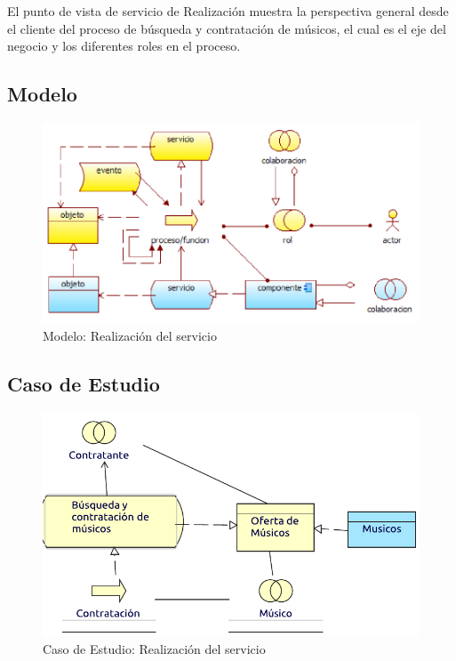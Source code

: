 El punto de vista de servicio de Realización muestra la perspectiva general desde el cliente del proceso de búsqueda y contratación de músicos, el cual es el eje del negocio y los diferentes roles en el proceso.

\subsection{Modelo}
\begin{figure}[h!]
	\centering
	\includegraphics[width=\linewidth]{Arquitectura/Tecnologia/imgs/realizacionMetamodelo.PNG}
	\caption{Modelo: Realización del servicio}
\end{figure}
\newpage
\subsection{Caso de Estudio}

\begin{figure}[hbt!]
	\centering
	\includegraphics[width=\linewidth]{Arquitectura/Tecnologia/imgs/realizacion.pdf}
	\caption{Caso de Estudio: Realización del servicio}
\end{figure}

